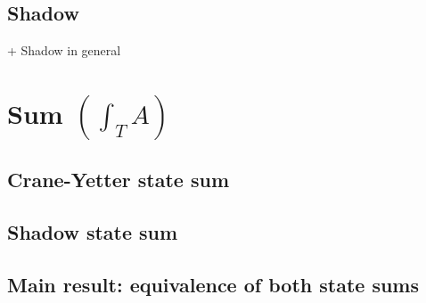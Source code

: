 \subsection{Shadow}
+ Shadow in general

\section{Sum $\left( \int_{T}{A} \right)$}
\subsection{Crane-Yetter state sum}
\subsection{Shadow state sum}
\subsection{Main result: equivalence of both state sums}
